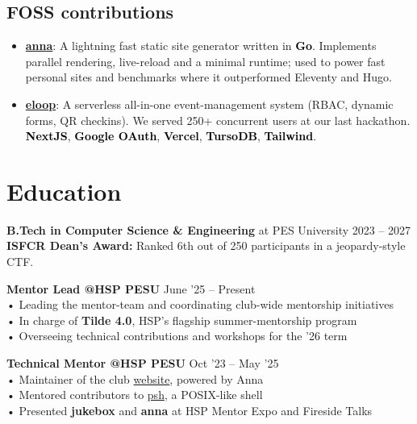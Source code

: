 \documentclass[a4,12pt]{article}
\newcommand{\tech}[1]{\textbf{\textcolor{black}{#1}}}
\begin{document}
\begin{small}
\section{FOSS contributions}
\begin{itemize}[nolistsep, nosep, partopsep=0pt, leftmargin=1.2em, labelsep=0.6em, itemsep=0pt, topsep=0pt, parsep=0pt]
	\item \textbf{\href{https://github.com/anna-ssg/anna}{anna}}: A lightning fast static site generator written in \tech{Go}. Implements parallel rendering, live-reload and a minimal runtime; used to power fast personal sites and benchmarks where it outperformed Eleventy and Hugo.
	\item \textbf{\href{https://github.com/homebrew-ec-foss/eloop}{eloop}}: A serverless all-in-one event-management system (RBAC, dynamic forms, QR checkins). We served 250+ concurrent users at our last hackathon. \tech{NextJS}, \tech{Google OAuth}, \tech{Vercel}, \tech{TursoDB}, \tech{Tailwind}.
\end{itemize}
\end{small}

\section{Education}
\textbf{B.Tech in Computer Science \& Engineering} at PES University \hfill 2023 – 2027 \\
\textbf{ISFCR Dean's Award:} Ranked 6th out of 250 participants in a jeopardy-style CTF.

\textbf{Mentor Lead @HSP PESU} \hfill June '25 – Present \\
• Leading the mentor-team and coordinating club-wide mentorship initiatives \\
• In charge of \textbf{Tilde 4.0}, HSP's flagship summer-mentorship program \\
• Overseeing technical contributions and workshops for the '26 term

\textbf{Technical Mentor @HSP PESU} \hfill Oct '23 – May '25 \\
• Maintainer of the club \href{https://hsp-ec.xyz}{website}, powered by Anna \\
• Mentored contributors to \href{https://github.com/homebrew-ec-foss/psh}{psh}, a POSIX-like shell \\
• Presented \textbf{jukebox} and \textbf{anna} at HSP Mentor Expo and Fireside Talks
\end{document}
